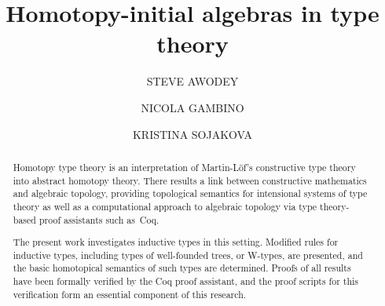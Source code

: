 \documentclass[reqno,10pt,a4paper,oneside]{amsart}
\numberwithin{equation}{section}
\theoremstyle{mythm}
\theoremstyle{mydef}
\theoremstyle{myrmk}
\begin{document}

\title{Homotopy-initial algebras in type theory}
\author[S. Awodey]{STEVE AWODEY}

\address{Carnegie Mellon University}
\author[N. Gambino]{NICOLA GAMBINO}

\address{School of Mathematics, University of Leeds}


\author[K. Sojakova]{KRISTINA SOJAKOVA}

\address{Carnegie Mellon University}



%













\begin{abstract}
Homotopy type theory is an interpretation of Martin-L\"of's constructive type theory into abstract homotopy theory.   There results a link between constructive mathematics and algebraic topology, providing topological semantics for intensional systems of type theory as well as a computational approach to algebraic topology via type theory-based proof assistants such as~Coq.

The present work investigates inductive types in this setting. Modified rules for inductive types, including types of well-founded trees, or W-types, are presented, and the basic homotopical semantics of such types are determined.  Proofs of all results have been formally verified by the Coq proof assistant, and the proof scripts for this verification form an essential component of this research.      
\end{abstract}
\end{document}
